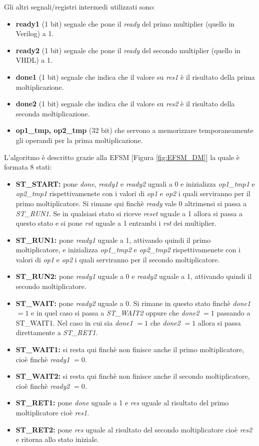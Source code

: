 \documentclass[]{IEEEtran}
\begin{document}
Gli altri segnali/registri intermedi utilizzati sono:
\begin{itemize}
    \item \textbf{ready1} (1 bit) segnale che pone il \textit{ready} del primo multiplier (quello in Verilog) a 1.
    \item \textbf{ready2} (1 bit) segnale che pone il \textit{ready} del secondo multiplier (quello in VHDL) a 1.
    \item \textbf{done1} (1 bit) segnale che indica che il valore su \textit{res1} è il risultato della prima moltiplicazione.
    \item \textbf{done2} (1 bit) segnale che indica che il valore su \textit{res2} è il risultato della seconda moltiplicazione.
    \item \textbf{op1\_tmp, op2\_tmp} (32 bit) che servono a memorizzare temporaneamente gli operandi per la prima moltiplicazione.
\end{itemize}

L'algoritmo è descritto grazie alla EFSM [Figura \ref{fig:EFSM_DM}] la quale è formata 8 stati:
\begin{itemize}
    \item \textbf{ST\_START:} pone \textit{done}, \textit{ready1} e \textit{ready2} uguali a 0 e inizializza \textit{op1\_tmp1} e \textit{op2\_tmp1} rispettivamenete con i valori di \textit{op1} e \textit{op2} i quali serviranno per il primo moltiplicatore. Si rimane qui finchè \textit{ready} vale 0 altrimensi si passa a \textit{ST\_RUN1}. Se in qualsiasi stato si riceve \textit{reset} uguale a 1 allora si passa a questo stato e si pone \textit{rst} uguale a 1 entrambi i \textit{rst} dei multiplier.
    \item \textbf{ST\_RUN1:} pone \textit{ready1} uguale a 1, attivando quindi il primo moltiplicatore, e inizializza \textit{op1\_tmp2} e \textit{op2\_tmp2} rispettivamenete con i valori di \textit{op1} e \textit{op2} i quali serviranno per il secondo moltiplicatore.
    \item \textbf{ST\_RUN2:} pone \textit{ready1} uguale a 0 e \textit{ready2} uguale a 1, attivando quindi il secondo moltiplicatore.
    \item \textbf{ST\_WAIT:} pone \textit{ready2} uguale a 0. Si rimane in questo stato finchè \textit{done1} $=1$ e in quel caso si passa a \textit{ST\_WAIT2} oppure che \textit{done2} $=1$ passando a {ST\_WAIT1}. Nel caso in cui sia \textit{done1} $=1$ che \textit{done2} $=1$ allora si passa direttamente a \textit{ST\_RET1}.
    \item \textbf{ST\_WAIT1:} si resta qui finchè non finisce anche il primo moltiplicatore, cioè finchè \textit{ready1} $=0$.
    \item \textbf{ST\_WAIT2:} si resta qui finchè non finisce anche il secondo moltiplicatore, cioè finchè \textit{ready2} $=0$.
    \item \textbf{ST\_RET1:} pone \textit{done} uguale a 1 e \textit{res} uguale al risultato del primo moltiplicatore cioè \textit{res1}.
    \item \textbf{ST\_RET2:} pone \textit{res} uguale al risultato del secondo moltiplicatore cioè \textit{res2} e ritorna allo stato iniziale.
\end{itemize}
\end{document}
